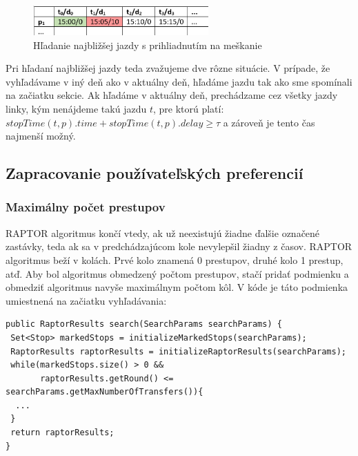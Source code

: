 \begin{figure}[H]
\centerline{\includegraphics[width=0.6\textwidth]{images/shedule-delays}}
\caption[Hľadanie najbližšej jazdy s prihliadnutím na meškanie]{Hľadanie najbližšej jazdy s prihliadnutím na meškanie}
\label{fig:shedule-delays}
\end{figure} 

Pri hľadaní najbližšej jazdy teda zvažujeme dve rôzne situácie. V prípade, že vyhľadávame v iný deň ako v aktuálny deň, hľadáme jazdu tak ako sme spomínali na začiatku sekcie. Ak hľadáme v aktuálny deň, prechádzame cez všetky jazdy linky, kým nenájdeme takú jazdu $t$, pre ktorú platí:
$stopTime(t, p).time + stopTime(t, p).delay \geq \tau$ a zároveň je tento čas najmenší možný.

\subsection{Zapracovanie používateľských preferencií}
\subsubsection{Maximálny počet prestupov}
RAPTOR algoritmus končí vtedy, ak už neexistujú žiadne ďalšie označené zastávky, teda ak sa v predchádzajúcom kole nevylepšil žiadny z časov. RAPTOR algoritmus beží v kolách. Prvé kolo znamená 0 prestupov, druhé kolo 1 prestup, atď. Aby bol algoritmus obmedzený počtom prestupov, stačí pridať podmienku a obmedziť algoritmus navyše maximálnym počtom kôl. V kóde je táto podmienka umiestnená na začiatku vyhľadávania:
\begin{lstlisting} 
public RaptorResults search(SearchParams searchParams) {
 Set<Stop> markedStops = initializeMarkedStops(searchParams);
 RaptorResults raptorResults = initializeRaptorResults(searchParams);
 while(markedStops.size() > 0 && 
       raptorResults.getRound() <= searchParams.getMaxNumberOfTransfers()){        
  ...
 }
 return raptorResults;
}
\end{lstlisting}

